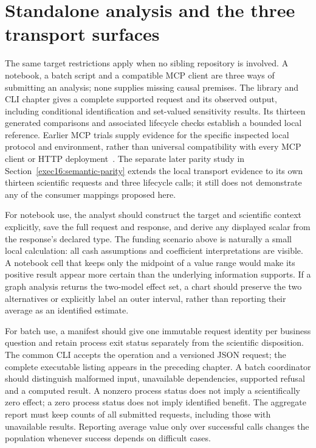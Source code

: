 \section{Standalone analysis and the three transport surfaces}

The same target restrictions apply when no sibling repository is involved.
A notebook, a batch script and a compatible MCP client are three ways of
submitting an analysis; none supplies missing causal premises. The library
and CLI chapter gives a complete supported request and its observed output,
including conditional identification and set-valued sensitivity results.
Its thirteen generated comparisons and associated lifecycle checks establish
a bounded local reference. Earlier MCP trials supply evidence for the
specific inspected local protocol and environment, rather than universal
compatibility with every MCP client or HTTP deployment~\citep{exec13_i2_examples,v12_in_runtime}. The separate later parity study in Section~\ref{exec16:semantic-parity} extends the local transport evidence to its own thirteen scientific requests and three lifecycle calls; it still does not demonstrate any of the consumer mappings proposed here.

For notebook use, the analyst should construct the target and scientific
context explicitly, save the full request and response, and derive any
displayed scalar from the response's declared type. The funding scenario
above is naturally a small local calculation: all cash assumptions and
coefficient interpretations are visible. A notebook cell that keeps only
the midpoint of a value range would make its positive result appear more
certain than the underlying information supports. If a graph analysis
returns the two-model effect set, a chart should preserve the two alternatives
or explicitly label an outer interval, rather than reporting their average
as an identified estimate.

For batch use, a manifest should give one immutable request identity per
business question and retain process exit status separately from the
scientific disposition. The common CLI accepts the operation and a versioned
JSON request; the complete executable listing appears in the preceding
chapter. A batch coordinator should distinguish malformed input, unavailable
dependencies, supported refusal and a computed result. A nonzero process
status does not imply a scientifically zero effect; a zero process status
does not imply identified benefit. The aggregate report must keep counts of
all submitted requests, including those with unavailable results. Reporting
average value only over successful calls changes the population whenever
success depends on difficult cases.

